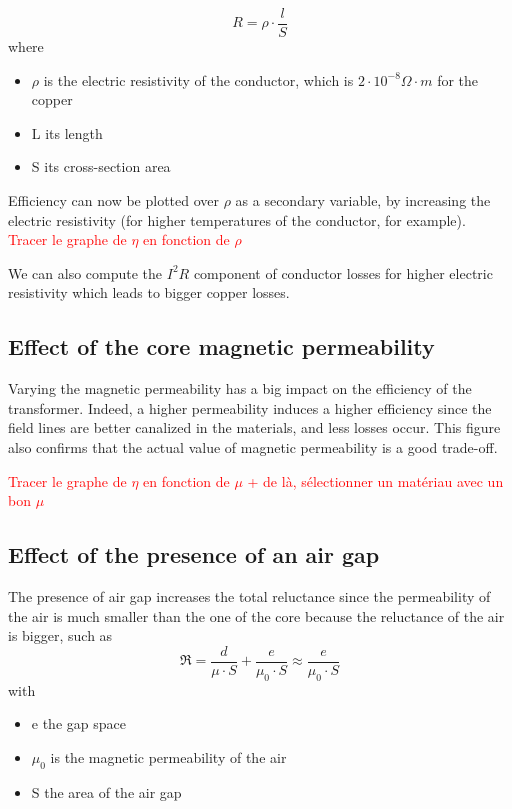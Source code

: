\documentclass[12pt,a4paper]{report}
\begin{document}
\begin{equation}
    R = \rho \cdot \frac{l}{S}
    \label{eq:pouillet}
\end{equation}
where 
\begin{itemize}
    \item $\rho$ is the electric resistivity of the conductor, which is $2 \cdot 10^{-8} \Omega \cdot m$ for the copper
    \item L its length 
    \item S its cross-section area
\end{itemize}

Efficiency can now be plotted over $\rho$ as a secondary variable, by increasing the electric resistivity (for higher temperatures of the conductor, for example).\\

\textcolor{red}{Tracer le graphe de $\eta$ en fonction de $\rho$}

We can also compute the $I^2R$ component of conductor losses for higher electric resistivity which leads to bigger copper losses.

\subsection{Effect of the core magnetic permeability}
Varying the magnetic permeability has a big impact on the efficiency of the transformer. Indeed, a higher permeability induces a higher efficiency since the field lines are better canalized in the materials, and less losses occur. This figure also confirms that the actual value of magnetic permeability is a good trade-off.

\textcolor{red}{Tracer le graphe de $\eta$ en fonction de $\mu$ + de là, sélectionner un matériau avec un bon $\mu$}

\subsection{Effect of the presence of an air gap}
The presence of air gap increases the total reluctance since the permeability of the air is much smaller than the one of the core because the reluctance of the air is bigger, such as
\begin{equation}
    \Re = \frac{d}{\mu \cdot S} + \frac{e}{\mu_0 \cdot S} \approx \frac{e}{\mu_0 \cdot S}
    \label{eq:total_reluctance}
\end{equation}
with
\begin{itemize}
    \item e the gap space
    \item $\mu_0$ is the magnetic permeability of the air
    \item S the area of the air gap
\end{itemize}
\end{document}
